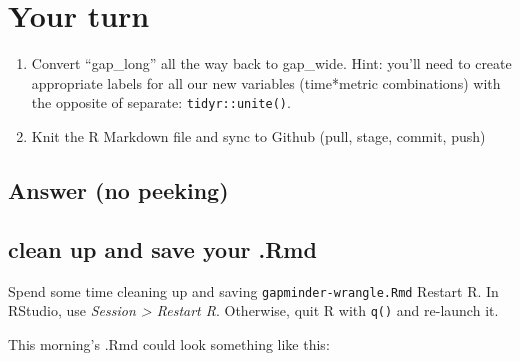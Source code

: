 \documentclass[]{book}
\newenvironment{Shaded}{\begin{snugshade}}{\end{snugshade}}
\newcommand{\KeywordTok}[1]{\textcolor[rgb]{0.13,0.29,0.53}{\textbf{{#1}}}}
\newcommand{\DataTypeTok}[1]{\textcolor[rgb]{0.13,0.29,0.53}{{#1}}}
\newcommand{\StringTok}[1]{\textcolor[rgb]{0.31,0.60,0.02}{{#1}}}
\newcommand{\CommentTok}[1]{\textcolor[rgb]{0.56,0.35,0.01}{\textit{{#1}}}}
\newcommand{\NormalTok}[1]{{#1}}
\theoremstyle{definition}
\theoremstyle{definition}
\theoremstyle{definition}
\theoremstyle{remark}
\begin{document}
\section{Your turn}\label{your-turn-11}

\begin{enumerate}
\def\labelenumi{\arabic{enumi}.}
\item
  Convert ``gap\_long'' all the way back to gap\_wide. Hint: you'll need
  to create appropriate labels for all our new variables (time*metric
  combinations) with the opposite of separate: \texttt{tidyr::unite()}.
\item
  Knit the R Markdown file and sync to Github (pull, stage, commit,
  push)
\end{enumerate}

\subsection{Answer (no peeking)}\label{answer-no-peeking-2}

\begin{Shaded}
\end{Shaded}

\subsection{clean up and save your
.Rmd}\label{clean-up-and-save-your-.rmd}

Spend some time cleaning up and saving \texttt{gapminder-wrangle.Rmd}
Restart R. In RStudio, use \emph{Session \textgreater{} Restart R}.
Otherwise, quit R with \texttt{q()} and re-launch it.

This morning's .Rmd could look something like this:
\end{document}
